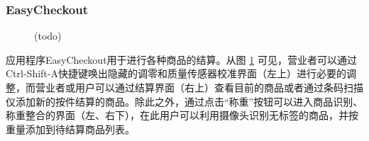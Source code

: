 \subsubsection{EasyCheckout}

\begin{figure}[htbp]
    \centering
    \hfill
    \vspace{1em}
    \hfill
	\caption{(todo)}
	\label{fig:ec}
\end{figure}

应用程序EasyCheckout用于进行各种商品的结算。从图 \ref{fig:ec} 可见，营业者可以通过Ctrl-Shift-A快捷键唤出隐藏的调零和质量传感器校准界面（左上）进行必要的调整，而营业者或用户可以通过结算界面（右上）查看目前的商品或者通过条码扫描仪添加新的按件结算的商品。除此之外，通过点击“称重”按钮可以进入商品识别、称重整合的界面（左、右下），在此用户可以利用摄像头识别无标签的商品，并按重量添加到待结算商品列表。